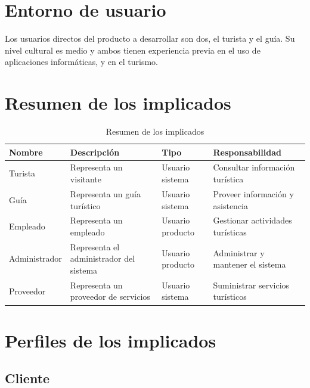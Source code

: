 

\section*{Entorno de usuario}

Los usuarios directos del producto a desarrollar son dos, el turista y el guía. Su nivel cultural es medio y ambos tienen experiencia previa en el uso de aplicaciones informáticas, y en el turismo.

\section*{Resumen de los implicados}

\begin{table}[H]
\centering
\begin{tabular}{|p{3cm}|p{3cm}|p{4cm}|p{4cm}|}
\hline
\rowcolor[HTML]{CFE2F3} 
\textbf{Nombre} & \textbf{Descripción} & \textbf{Tipo} & \textbf{Responsabilidad} \\ \hline
Turista & Representa un visitante & Usuario sistema & Consultar información turística \\ \hline
Guía & Representa un guía turístico & Usuario sistema & Proveer información y asistencia \\ \hline
Empleado & Representa un empleado & Usuario producto & Gestionar actividades turísticas \\ \hline
Administrador & Representa el administrador del sistema & Usuario producto & Administrar y mantener el sistema \\ \hline
Proveedor & Representa un proveedor de servicios & Usuario sistema & Suministrar servicios turísticos \\ \hline
\end{tabular}
\caption{Resumen de los implicados}
\label{tab:resumen_implicados}
\end{table}

\section*{Perfiles de los implicados}

\subsection*{Cliente}

